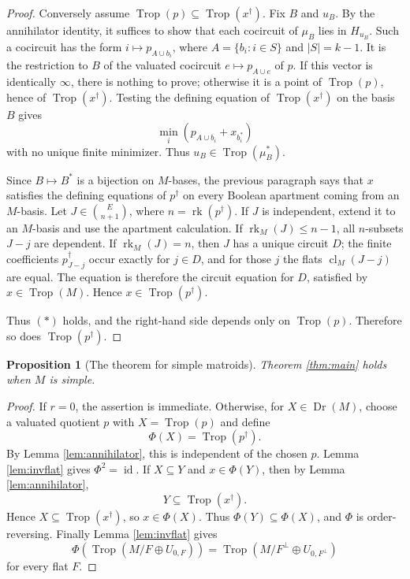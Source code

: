 \documentclass[12pt]{article}
\newtheorem{proposition}[theorem]{Proposition}
\theoremstyle{definition}
\newcommand{\Trop}{\operatorname{Trop}}
\newcommand{\Dr}{\operatorname{Dr}}
\newcommand{\rk}{\operatorname{rk}}
\newcommand{\cl}{\operatorname{cl}}
\newcommand{\binomE}[1]{\binom{E}{#1}}
\begin{document}
\begin{proof}
Conversely assume \(\Trop(p)\subseteq\Trop(x^\dagger)\).  Fix \(B\) and \(u_B\).  By the annihilator identity, it suffices to show that each cocircuit of \(\mu_B\) lies in \(H_{u_B}\).  Such a cocircuit has the form \(i\mapsto p_{A\cup b_i}\), where \(A=\{b_i:i\in S\}\) and \(|S|=k-1\).  It is the restriction to \(B\) of the valuated cocircuit \(e\mapsto p_{A\cup e}\) of \(p\).  If this vector is identically \(\infty\), there is nothing to prove; otherwise it is a point of \(\Trop(p)\), hence of \(\Trop(x^\dagger)\).  Testing the defining equation of \(\Trop(x^\dagger)\) on the basis \(B\) gives
\[
\min_i(p_{A\cup b_i}+x_{b_i^*})
\]
with no unique finite minimizer.  Thus \(u_B\in\Trop(\mu_B^*)\).

Since \(B\mapsto B^*\) is a bijection on \(M\)-bases, the previous paragraph says that \(x\) satisfies the defining equations of \(p^\dagger\) on every Boolean apartment coming from an \(M\)-basis.  Let \(J\in\binomE{n+1}\), where \(n=\rk(p^\dagger)\).  If \(J\) is independent, extend it to an \(M\)-basis and use the apartment calculation.  If \(\rk_M(J)\le n-1\), all \(n\)-subsets \(J-j\) are dependent.  If \(\rk_M(J)=n\), then \(J\) has a unique circuit \(D\); the finite coefficients \(p^\dagger_{J-j}\) occur exactly for \(j\in D\), and for those \(j\) the flats \(\cl_M(J-j)\) are equal.  The equation is therefore the circuit equation for \(D\), satisfied by \(x\in\Trop(M)\).  Hence \(x\in\Trop(p^\dagger)\).

Thus \((*)\) holds, and the right-hand side depends only on \(\Trop(p)\).  Therefore so does \(\Trop(p^\dagger)\).
\end{proof}

\begin{proposition}[The theorem for simple matroids]\label{prop:simple}
Theorem \ref{thm:main} holds when \(M\) is simple.
\end{proposition}

\begin{proof}
If \(r=0\), the assertion is immediate.  Otherwise, for \(X\in\Dr(M)\), choose a valuated quotient \(p\) with \(X=\Trop(p)\) and define
\[
\Phi(X)=\Trop(p^\dagger).
\]
By Lemma \ref{lem:annihilator}, this is independent of the chosen \(p\).  Lemma \ref{lem:invflat} gives \(\Phi^2=\operatorname{id}\).  If \(X\subseteq Y\) and \(x\in\Phi(Y)\), then by Lemma \ref{lem:annihilator},
\[
Y\subseteq\Trop(x^\dagger).
\]
Hence \(X\subseteq\Trop(x^\dagger)\), so \(x\in\Phi(X)\).  Thus \(\Phi(Y)\subseteq\Phi(X)\), and \(\Phi\) is order-reversing.  Finally Lemma \ref{lem:invflat} gives
\[
\Phi\!\left(\Trop(M/F\oplus U_{0,F})\right)
=
\Trop(M/F^\perp\oplus U_{0,F^\perp})
\]
for every flat \(F\).
\end{proof}
\end{document}
